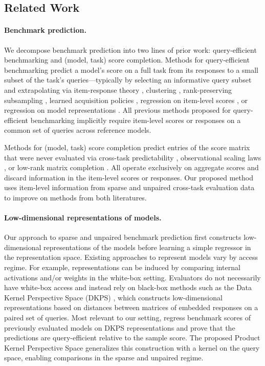 \documentclass{article}
\theoremstyle{definition}
\theoremstyle{plain}
\begin{document}
\subsection{Related Work}
\label{sec:related}

\paragraph{Benchmark prediction.}
We decompose benchmark prediction into two lines of prior work: query-efficient
benchmarking and (model, task) score completion.
Methods for query-efficient benchmarking predict a model's score on a full task from
its responses to a small subset of the task's queries---typically by selecting an
informative query subset and extrapolating via item-response theory
\citep{polo2024tinybenchmarks, hofmann2025fluid}, clustering
\citep{vivek2024anchor}, rank-preserving subsampling \citep{perlitz2024efficient},
learned acquisition policies \citep{li2024active}, regression on item-level scores
\citep{bowyer2026efficient}, or regression on model representations
\citep{dkps_qeff}.
All previous methods proposed for query-efficient benchmarking implicitly require
item-level scores or responses on a common set of queries across reference models.

Methods for (model, task) score completion predict entries of the score matrix that
were never evaluated via cross-task predictability \citep{ye2023predictable},
observational scaling laws \citep{ruan2024observational}, or low-rank matrix
completion \citep{benchpress}. All operate exclusively on aggregate scores and
discard information in the item-level scores or responses.
Our proposed method uses item-level information from sparse and unpaired cross-task evaluation
data to improve on methods from both literatures.

\paragraph{Low-dimensional representations of models.}
Our approach to sparse and unpaired benchmark prediction first constructs low-dimensional representations of the models before learning a simple regressor in the representation space.
Existing approaches to represent models vary by access regime.
For example, representations can be induced by comparing internal activations
\citep{duderstadt2023comparing, huh2024platonic} and/or weights
\citep{chen2025weights} in the white-box setting.
Evaluators do not necessarily have white-box access and instead rely on black-box methods such as
the Data Kernel Perspective Space (DKPS) \citep{helm2024tracking,helm2025inference}, which constructs low-dimensional representations based on distances between matrices of embedded responses on a paired set of queries.
Most relevant to our setting, \citet{dkps_qeff} regress benchmark scores of
previously evaluated models on DKPS representations and prove that the predictions are query-efficient relative to the sample score.
The proposed Product Kernel Perspective Space generalizes this construction with a kernel on the query space, enabling comparisons in the sparse and unpaired regime.
\end{document}
